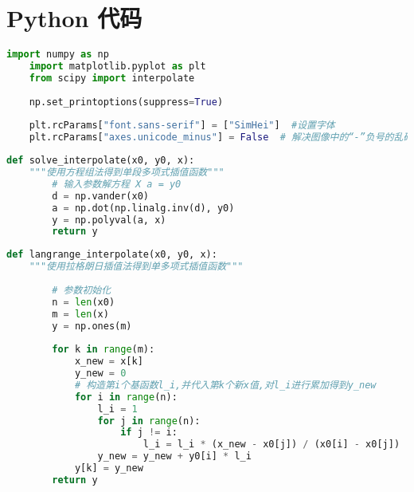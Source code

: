 \documentclass[withoutpreface]{cumcmthesis}
\begin{document}
\section{Python 代码}

    \begin{lstlisting}[language=python ,caption={初始化} ]
    import numpy as np
    import matplotlib.pyplot as plt
    from scipy import interpolate
    
    np.set_printoptions(suppress=True)
    
    plt.rcParams["font.sans-serif"] = ["SimHei"]  #设置字体
    plt.rcParams["axes.unicode_minus"] = False  # 解决图像中的“-”负号的乱码问题
    \end{lstlisting}

    \begin{lstlisting}[language=python ,caption={待定系数方程法} ]
    def solve_interpolate(x0, y0, x):
    """使用方程组法得到单段多项式插值函数"""
        # 输入参数解方程 X a = y0
        d = np.vander(x0)
        a = np.dot(np.linalg.inv(d), y0)
        y = np.polyval(a, x)
        return y
    \end{lstlisting}

    \begin{lstlisting}[language=python ,caption={拉格朗日插值法} ]
    def langrange_interpolate(x0, y0, x):
    """使用拉格朗日插值法得到单多项式插值函数"""
    
        # 参数初始化
        n = len(x0)
        m = len(x)
        y = np.ones(m)
    
        for k in range(m):
            x_new = x[k]
            y_new = 0
            # 构造第i个基函数l_i,并代入第k个新x值,对l_i进行累加得到y_new
            for i in range(n):
                l_i = 1
                for j in range(n):
                    if j != i:
                        l_i = l_i * (x_new - x0[j]) / (x0[i] - x0[j])
                y_new = y_new + y0[i] * l_i
            y[k] = y_new
        return y
    \end{lstlisting}
\end{document}
